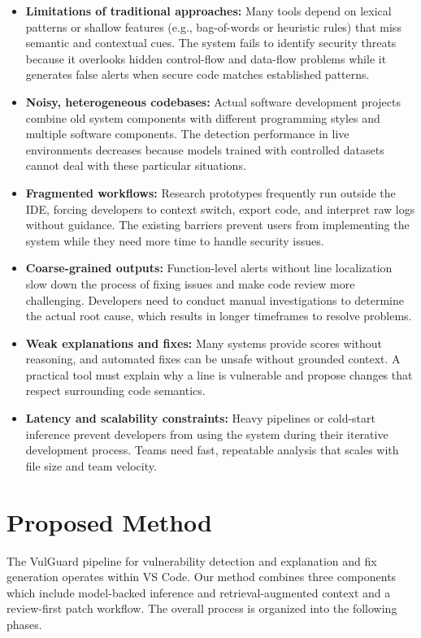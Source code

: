 \begin{itemize}
    \item \textbf{Limitations of traditional approaches:} Many tools depend on lexical patterns or shallow features (e.g., bag-of-words or heuristic rules) that miss semantic and contextual cues. The system fails to identify security threats because it overlooks hidden control-flow and data-flow problems while it generates false alerts when secure code matches established patterns.
    \item \textbf{Noisy, heterogeneous codebases:} Actual software development projects combine old system components with different programming styles and multiple software components. The detection performance in live environments decreases because models trained with controlled datasets cannot deal with these particular situations.
    \item \textbf{Fragmented workflows:} Research prototypes frequently run outside the IDE, forcing developers to context switch, export code, and interpret raw logs without guidance. The existing barriers prevent users from implementing the system while they need more time to handle security issues.
    \item \textbf{Coarse-grained outputs:} Function-level alerts without line localization slow down the process of fixing issues and make code review more challenging. Developers need to conduct manual investigations to determine the actual root cause, which results in longer timeframes to resolve problems.
    \item \textbf{Weak explanations and fixes:} Many systems provide scores without reasoning, and automated fixes can be unsafe without grounded context. A practical tool must explain why a line is vulnerable and propose changes that respect surrounding code semantics.
    \item \textbf{Latency and scalability constraints:} Heavy pipelines or cold-start inference prevent developers from using the system during their iterative development process. Teams need fast, repeatable analysis that scales with file size and team velocity.
\end{itemize}

\chapter{Proposed Method}
\label{ch:proposed-method}

The VulGuard pipeline for vulnerability detection and explanation and fix generation operates within VS Code. Our method combines three components which include model-backed inference and retrieval-augmented context and a review-first patch workflow. The overall process is organized into the following phases.

